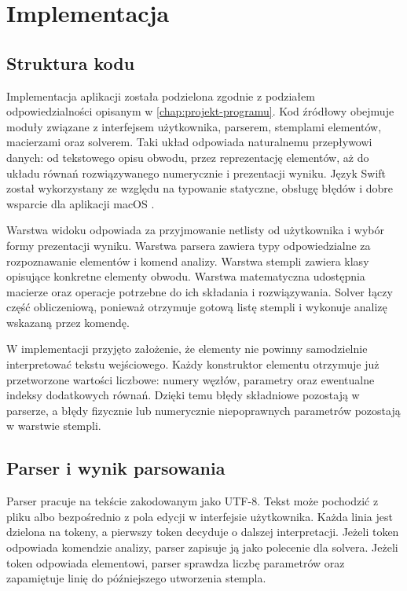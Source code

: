 \chapter{Implementacja}
\label{chap:implementacja}

\section{Struktura kodu}
\label{sec:struktura-kodu}

Implementacja aplikacji została podzielona zgodnie z podziałem odpowiedzialności opisanym w \cref{chap:projekt-programu}. Kod źródłowy obejmuje moduły związane z interfejsem użytkownika, parserem, stemplami elementów, macierzami oraz solverem. Taki układ odpowiada naturalnemu przepływowi danych: od tekstowego opisu obwodu, przez reprezentację elementów, aż do układu równań rozwiązywanego numerycznie i prezentacji wyniku. Język Swift został wykorzystany ze względu na typowanie statyczne, obsługę błędów i dobre wsparcie dla aplikacji macOS \cite{swiftlanguage}.

Warstwa widoku odpowiada za przyjmowanie netlisty od użytkownika i wybór formy prezentacji wyniku. Warstwa parsera zawiera typy odpowiedzialne za rozpoznawanie elementów i komend analizy. Warstwa stempli zawiera klasy opisujące konkretne elementy obwodu. Warstwa matematyczna udostępnia macierze oraz operacje potrzebne do ich składania i rozwiązywania. Solver łączy część obliczeniową, ponieważ otrzymuje gotową listę stempli i wykonuje analizę wskazaną przez komendę.

W implementacji przyjęto założenie, że elementy nie powinny samodzielnie interpretować tekstu wejściowego. Każdy konstruktor elementu otrzymuje już przetworzone wartości liczbowe: numery węzłów, parametry oraz ewentualne indeksy dodatkowych równań. Dzięki temu błędy składniowe pozostają w parserze, a błędy fizycznie lub numerycznie niepoprawnych parametrów pozostają w warstwie stempli.

\section{Parser i wynik parsowania}
\label{sec:implementacja-parser}

Parser pracuje na tekście zakodowanym jako UTF-8. Tekst może pochodzić z pliku albo bezpośrednio z pola edycji w interfejsie użytkownika. Każda linia jest dzielona na tokeny, a pierwszy token decyduje o dalszej interpretacji. Jeżeli token odpowiada komendzie analizy, parser zapisuje ją jako polecenie dla solvera. Jeżeli token odpowiada elementowi, parser sprawdza liczbę parametrów oraz zapamiętuje linię do późniejszego utworzenia stempla.

